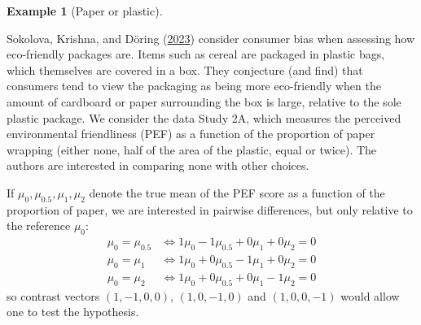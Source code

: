 \documentclass[
  11pt,
  letterpaper,
]{scrbook}
\theoremstyle{definition}
\newtheorem{example}{Example}[chapter]
\theoremstyle{remark}
\begin{document}
\begin{example}[Paper or
plastic]\protect\hypertarget{exm-paperorplastic}{}\label{exm-paperorplastic}

Sokolova, Krishna, and Döring
(\protect\hyperlink{ref-Sokolova.Krishna.Doring:2023}{2023}) consider
consumer bias when assessing how eco-friendly packages are. Items such
as cereal are packaged in plastic bags, which themselves are covered in
a box. They conjecture (and find) that consumers tend to view the
packaging as being more eco-friendly when the amount of cardboard or
paper surrounding the box is large, relative to the sole plastic
package. We consider the data Study 2A, which measures the perceived
environmental friendliness (PEF) as a function of the proportion of
paper wrapping (either none, half of the area of the plastic, equal or
twice). The authors are interested in comparing none with other choices.

If \(\mu_{0}, \mu_{0.5}, \mu_{1}, \mu_2\) denote the true mean of the
PEF score as a function of the proportion of paper, we are interested in
pairwise differences, but only relative to the reference \(\mu_{0}\):
\begin{align*}
\mu_0 = \mu_{0.5}  & \iff 1\mu_0 - 1\mu_{0.5} + 0\mu_{1} + 0 \mu_{2} = 0\\
\mu_0 = \mu_{1} & \iff 1\mu_0 + 0\mu_{0.5} -1\mu_{1} + 0 \mu_{2} = 0\\
\mu_0 = \mu_{2} & \iff 1\mu_0 + 0\mu_{0.5} + 0\mu_{1} -1 \mu_{2} = 0
\end{align*} so contrast vectors \((1, -1, 0, 0)\), \((1, 0, -1, 0)\)
and \((1, 0, 0, -1)\) would allow one to test the hypothesis.


\end{example}
\end{document}
